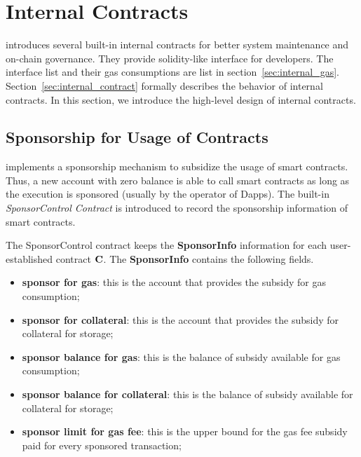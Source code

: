 \section{Internal Contracts}
\label{sec:internal}
\name introduces several built-in internal contracts for better system maintenance and on-chain governance.
%
They provide solidity-like interface for developers. The interface list and their gas consumptions are list in section~\ref{sec:internal_gas}. Section~\ref{sec:internal_contract} formally describes the behavior of internal contracts. In this section, we introduce the high-level design of internal contracts. 


\subsection{Sponsorship for Usage of Contracts}
\label{sec:sponsor}

\name implements a sponsorship mechanism to subsidize the usage of smart contracts. 
Thus, a new account with zero balance is able to call smart contracts as long as the execution is sponsored (usually by the operator of Dapps).
The built-in \emph{SponsorControl Contract} is introduced to record the sponsorship information of smart contracts.

The SponsorControl contract keeps the {\bf SponsorInfo} information for each user-established contract $\mathbf{C}$. The {\bf SponsorInfo} contains the following fields. 
\begin{itemize}[nosep]
	\item {\bf sponsor for gas}: this is the account that provides the subsidy for gas consumption;

	\item {\bf sponsor for collateral}: this is the account that provides the subsidy for collateral for storage; 

	\item {\bf sponsor balance for gas}: this is the balance of subsidy available for gas consumption;

	\item {\bf sponsor balance for collateral}: this is the balance of subsidy available for collateral for storage;

	\item {\bf sponsor limit for gas fee}: this is the upper bound for the gas fee subsidy paid for every sponsored transaction;
\end{itemize}

